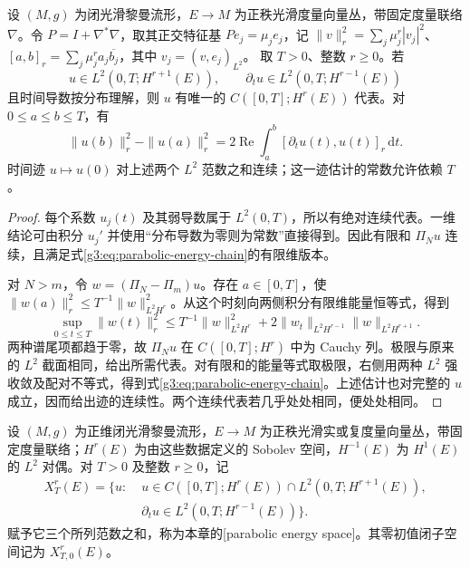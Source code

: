\begin{lemma}\label{g3:lem:parabolic-energy-trace}
	设 \((M,g)\) 为闭光滑黎曼流形，\(E\to M\) 为正秩光滑度量向量丛，带固定度量联络 \(\nabla\)。令 \(P=I+\nabla^*\nabla\)，取其正交特征基 \(Pe_j=\mu_je_j\)，记 \(\|v\|_r^2=\sum_j\mu_j^r|v_j|^2\)、\([a,b]_r=\sum_j\mu_j^ra_j\overline{b_j}\)，其中 \(v_j=(v,e_j)_{L^2}\)。
	取 \(T>0\)、整数 \(r\ge0\)。若
	\[
		u\in L^2(0,T;H^{r+1}(E)),\qquad
		\partial_tu\in L^2(0,T;H^{r-1}(E))
	\]
	且时间导数按分布理解，则 \(u\) 有唯一的 \(C([0,T];H^r(E))\) 代表。对 \(0\le a\le b\le T\)，有
	\begin{equation}\label{g3:eq:parabolic-energy-chain}
		\|u(b)\|_r^2-\|u(a)\|_r^2
		=2\operatorname{Re}\int_a^b[\partial_tu(t),u(t)]_r\,\mathrm dt.
	\end{equation}
	时间迹 \(u\mapsto u(0)\) 对上述两个 \(L^2\) 范数之和连续；这一迹估计的常数允许依赖 \(T\)。
\end{lemma}
\begin{proof}
	每个系数 \(u_j(t)\) 及其弱导数属于 \(L^2(0,T)\)，所以有绝对连续代表。一维结论可由积分 \(u_j'\) 并使用“分布导数为零则为常数”直接得到。因此有限和 \(\Pi_Nu\) 连续，且满足式\eqref{g3:eq:parabolic-energy-chain}的有限维版本。

	对 \(N>m\)，令 \(w=(\Pi_N-\Pi_m)u\)。存在 \(a\in[0,T]\)，使 \(\|w(a)\|_r^2\le T^{-1}\|w\|_{L^2H^r}^2\)。从这个时刻向两侧积分有限维能量恒等式，得到
	\[
		\sup_{0\le t\le T}\|w(t)\|_r^2
		\le T^{-1}\|w\|_{L^2H^r}^2
		+2\|w_t\|_{L^2H^{r-1}}\|w\|_{L^2H^{r+1}}.
	\]
	两种谱尾项都趋于零，故 \(\Pi_Nu\) 在 \(C([0,T];H^r)\) 中为 Cauchy 列。极限与原来的 \(L^2\) 截面相同，给出所需代表。对有限和的能量等式取极限，右侧用两种 \(L^2\) 强收敛及配对不等式，得到式\eqref{g3:eq:parabolic-energy-chain}。上述估计也对完整的 \(u\) 成立，因而给出迹的连续性。两个连续代表若几乎处处相同，便处处相同。
\end{proof}

\begin{definition}\label{g3:def:parabolic-energy-space}
	设 \((M,g)\) 为正维闭光滑黎曼流形，\(E\to M\) 为正秩光滑实或复度量向量丛，带固定度量联络；\(H^r(E)\) 为由这些数据定义的 Sobolev 空间，\(H^{-1}(E)\) 为 \(H^1(E)\) 的 \(L^2\) 对偶。对 \(T>0\) 及整数 \(r\ge0\)，记
	\begin{equation}\label{g3:eq:parabolic-energy-space}
		\begin{split}
		X_T^r(E)=\{u:\;&u\in C([0,T];H^r(E))\cap L^2(0,T;H^{r+1}(E)),\\
		&\partial_tu\in L^2(0,T;H^{r-1}(E))\}.
		\end{split}
	\end{equation}
	赋予它三个所列范数之和，称为本章的[parabolic energy space]。其零初值闭子空间记为 \(X_{T,0}^r(E)\)。
\end{definition}

